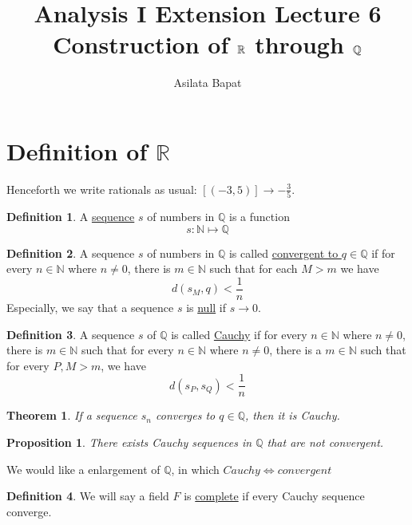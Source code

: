 \documentclass[12pt]{amsart}
\title{Analysis I Extension Lecture 6\\Construction of $\bbR$ through $\bbQ$}
\author{Asilata Bapat}
\newcommand{\bbR}{\mathbb{R}}
\newcommand{\bbN}{\mathbb{N}}
\newcommand{\bbQ}{\mathbb{Q}}
\theoremstyle{plain}
\newtheorem*{prop}{Proposition}
\newtheorem*{thm}{Theorem}
\theoremstyle{remark}
\theoremstyle{definition}
\newtheorem*{define}{Definition}
\begin{document}
\maketitle
{}
\section*{\bf Definition of $\bbR$}
Henceforth we write rationals as usual: $[(-3,5)] \rightarrow -\frac{3}{5}$.
\begin{define}
	A \ul{sequence} $s$ of numbers in $\bbQ$ is a function
	\begin{equation*}
		s: \bbN  \mapsto \bbQ
	\end{equation*}
\end{define}

\begin{define}
	A sequence $s$ of numbers in $\bbQ$ is called \ul{convergent to $q\in \bbQ$} if for every $n \in \bbN$ where $n \neq 0$, there is $m\in \bbN$ such that for each $M > m$ we have 
	\begin{equation*}
		d(s_M, q) < \frac{1}{n}
	\end{equation*}
	Especially, we say that a sequence $s$ is \ul{null} if $s \rightarrow 0$.
\end{define}

\begin{define}
	A sequence $s$ of $\bbQ$ is called \ul{Cauchy} if for every $n \in \bbN$ where $n \neq 0$, there is $m \in \bbN$ such that for every $n \in \bbN$ where $n \neq 0$, there is a $m \in \bbN$ such that for every $P,M > m$, we have 
	\begin{equation*}
		d(s_P, s_Q) < \frac{1}{n}
	\end{equation*}
\end{define}

\begin{thm}
	If a sequence $s_n$ converges to $q\in \bbQ$, then  it is Cauchy.
\end{thm}

\begin{prop}
	There exists Cauchy sequences in $\bbQ$ that are not convergent.
\end{prop}

\par
We would like a enlargement of $\bbQ$, in which $Cauchy \iff convergent$
\begin{define}
	We will say a field $F$ is \ul{complete} if every Cauchy sequence converge.
\end{define}
\end{document}
